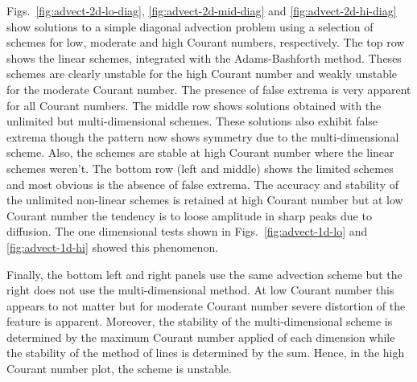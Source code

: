 Figs.~\ref{fig:advect-2d-lo-diag}, \ref{fig:advect-2d-mid-diag} and
\ref{fig:advect-2d-hi-diag} show solutions to a simple diagonal
advection problem using a selection of schemes for low, moderate and
high Courant numbers, respectively. The top row shows the linear
schemes, integrated with the Adams-Bashforth method. Theses schemes
are clearly unstable for the high Courant number and weakly unstable
for the moderate Courant number. The presence of false extrema is very
apparent for all Courant numbers. The middle row shows solutions
obtained with the unlimited but multi-dimensional schemes. These
solutions also exhibit false extrema though the pattern now shows
symmetry due to the multi-dimensional scheme. Also, the schemes are
stable at high Courant number where the linear schemes weren't. The
bottom row (left and middle) shows the limited schemes and most
obvious is the absence of false extrema. The accuracy and stability of
the unlimited non-linear schemes is retained at high Courant number
but at low Courant number the tendency is to loose amplitude in sharp
peaks due to diffusion. The one dimensional tests shown in
Figs.~\ref{fig:advect-1d-lo} and \ref{fig:advect-1d-hi} showed this
phenomenon.

Finally, the bottom left and right panels use the same advection
scheme but the right does not use the multi-dimensional method. At low
Courant number this appears to not matter but for moderate Courant
number severe distortion of the feature is apparent. Moreover, the
stability of the multi-dimensional scheme is determined by the maximum
Courant number applied of each dimension while the stability of the
method of lines is determined by the sum. Hence, in the high Courant
number plot, the scheme is unstable.

